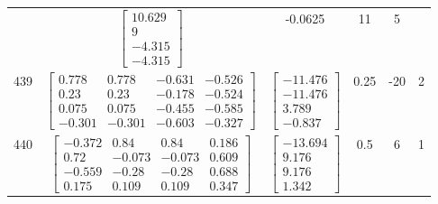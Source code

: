 \documentclass[a4paper,12pt]{article}
\begin{document}
\begin{tabular}{c c c c c c}
&
$\begin{bmatrix} 10.629 \\ 9 \\ -4.315 \\ -4.315 \end{bmatrix}$
&
-0.0625
&
11
&
5
\\
439
&
$\begin{bmatrix} 0.778 & 0.778 & -0.631 & -0.526 \\ 0.23 & 0.23 & -0.178 & -0.524 \\ 0.075 & 0.075 & -0.455 & -0.585 \\ -0.301 & -0.301 & -0.603 & -0.327 \end{bmatrix}$
&
$\begin{bmatrix} -11.476 \\ -11.476 \\ 3.789 \\ -0.837 \end{bmatrix}$
&
0.25
&
-20
&
2
\\
440
&
$\begin{bmatrix} -0.372 & 0.84 & 0.84 & 0.186 \\ 0.72 & -0.073 & -0.073 & 0.609 \\ -0.559 & -0.28 & -0.28 & 0.688 \\ 0.175 & 0.109 & 0.109 & 0.347 \end{bmatrix}$
&
$\begin{bmatrix} -13.694 \\ 9.176 \\ 9.176 \\ 1.342 \end{bmatrix}$
&
0.5
&
6
&
1
\\
\end{tabular} \egroup \newpage
\end{document}
